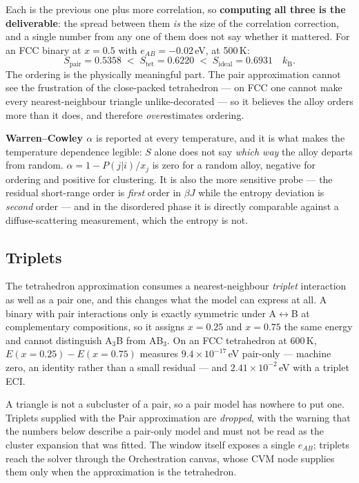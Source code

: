 Each is the previous one plus more correlation, so \textbf{computing all three
is the deliverable}: the spread between them \emph{is} the size of the
correlation correction, and a single number from any one of them does not say
whether it mattered. For an FCC binary at $x = 0.5$ with
$e_{AB} = -0.02$\,eV, at 500\,K:
\begin{equation}
  S_\mathrm{pair} = 0.5358 \;<\;
  S_\mathrm{tet}  = 0.6220 \;<\;
  S_\mathrm{ideal}= 0.6931 \quad k_\mathrm{B} .
\end{equation}
The ordering is the physically meaningful part. The pair approximation cannot
see the frustration of the close-packed tetrahedron --- on FCC one cannot make
every nearest-neighbour triangle unlike-decorated --- so it believes the alloy
orders more than it does, and therefore \emph{over}estimates ordering.

\begin{caltip}
\textbf{Warren--Cowley $\alpha$} is reported at every temperature, and it is
what makes the temperature dependence legible: $S$ alone does not say
\emph{which way} the alloy departs from random. $\alpha = 1 - P(j|i)/x_j$ is
zero for a random alloy, negative for ordering and positive for clustering. It
is also the more sensitive probe --- the residual short-range order is
\emph{first} order in $\beta J$ while the entropy deviation is \emph{second}
order --- and in the disordered phase it is directly comparable against a
diffuse-scattering measurement, which the entropy is not.
\end{caltip}

\subsection{Triplets}

The tetrahedron approximation consumes a nearest-neighbour \emph{triplet}
interaction as well as a pair one, and this changes what the model can express
at all. A binary with pair interactions only is exactly symmetric under
A$\leftrightarrow$B at complementary compositions, so it assigns $x = 0.25$ and
$x = 0.75$ the same energy and cannot distinguish A$_3$B from AB$_3$. On an FCC
tetrahedron at 600\,K, $E(x{=}0.25) - E(x{=}0.75)$ measures
$9.4\times10^{-17}$\,eV pair-only --- machine zero, an identity rather than a
small residual --- and $2.41\times10^{-2}$\,eV with a triplet ECI.

A triangle is not a subcluster of a pair, so a pair model has nowhere to put
one. Triplets supplied with the Pair approximation are \emph{dropped}, with the
warning that the numbers below describe a pair-only model and must not be read
as the cluster expansion that was fitted. The window itself exposes a single
$e_{AB}$; triplets reach the solver through the Orchestration canvas, whose CVM
node supplies them only when the approximation is the tetrahedron.

